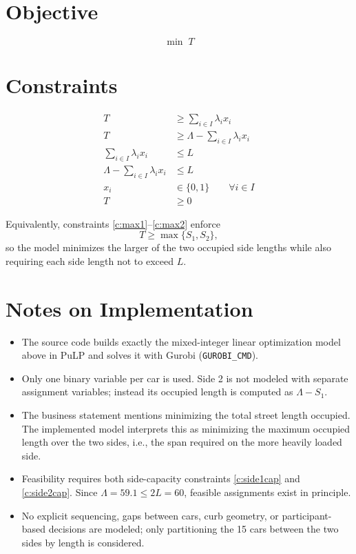 \section*{Objective}

\[
\min \; T
\]

\section*{Constraints}

\begin{align}
T &\ge \sum_{i \in I} \lambda_i x_i \label{c:max1} \\
T &\ge \Lambda - \sum_{i \in I} \lambda_i x_i \label{c:max2} \\
\sum_{i \in I} \lambda_i x_i &\le L \label{c:side1cap} \\
\Lambda - \sum_{i \in I} \lambda_i x_i &\le L \label{c:side2cap} \\
x_i &\in \{0,1\} \qquad \forall i \in I \label{c:binary} \\
T &\ge 0 \label{c:tnonneg}
\end{align}

Equivalently, constraints \eqref{c:max1}--\eqref{c:max2} enforce
\[
T \ge \max\{S_1,S_2\},
\]
so the model minimizes the larger of the two occupied side lengths while also requiring each side length not to exceed $L$.

\section*{Notes on Implementation}

\begin{itemize}
    \item The source code builds exactly the mixed-integer linear optimization model above in PuLP and solves it with Gurobi (\texttt{GUROBI\_CMD}).
    \item Only one binary variable per car is used. Side 2 is not modeled with separate assignment variables; instead its occupied length is computed as $\Lambda - S_1$.
    \item The business statement mentions minimizing the total street length occupied. The implemented model interprets this as minimizing the maximum occupied length over the two sides, i.e., the span required on the more heavily loaded side.
    \item Feasibility requires both side-capacity constraints \eqref{c:side1cap} and \eqref{c:side2cap}. Since $\Lambda=59.1 \le 2L = 60$, feasible assignments exist in principle.
    \item No explicit sequencing, gaps between cars, curb geometry, or participant-based decisions are modeled; only partitioning the 15 cars between the two sides by length is considered.
\end{itemize}
